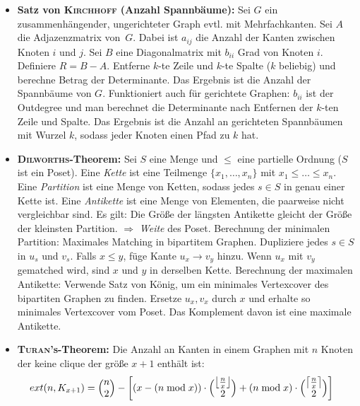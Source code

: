\begin{itemize}
	\item \textbf{Satz von \textsc{Kirchhoff} (Anzahl Spannbäume):}
	Sei $G$ ein zusammenhängender, ungerichteter Graph evtl. mit Mehrfachkanten.
	Sei $A$ die Adjazenzmatrix von~$G$.
	Dabei ist $a_{ij}$ die Anzahl der Kanten zwischen Knoten $i$ und $j$.
	Sei $B$ eine Diagonalmatrix mit $b_{ii}$ Grad von Knoten $i$.
	Definiere $R = B - A$.
	Entferne $k$-te Zeile und $k$-te Spalte ($k$ beliebig) und berechne Betrag der Determinante.
	Das Ergebnis ist die Anzahl der Spannbäume von $G$.
	\newline
	Funktioniert auch für gerichtete Graphen: $b_{ii}$ ist der Outdegree und man
	berechnet die Determinante nach Entfernen der $k$-ten Zeile und Spalte.
	Das Ergebnis ist die Anzahl an gerichteten Spannbäumen mit Wurzel $k$,
	sodass jeder Knoten einen Pfad zu $k$ hat.

	\item \textbf{\textsc{Dilworths}-Theorem:}
	Sei $S$ eine Menge und $\leq$ eine partielle Ordnung ($S$ ist ein Poset).
	Eine \emph{Kette} ist eine Teilmenge $\{x_1,\ldots,x_n\}$ mit $x_1 \leq \ldots \leq x_n$.
	Eine \emph{Partition} ist eine Menge von Ketten, sodass jedes $s \in S$ in genau einer Kette ist.
	Eine \emph{Antikette} ist eine Menge von Elementen, die paarweise nicht vergleichbar sind.
	\newline
	Es gilt: Die Größe der längsten Antikette gleicht der Größe der kleinsten Partition.
	$\Rightarrow$ \emph{Weite} des Poset.
	\newline
	Berechnung der minimalen Partition: Maximales Matching in bipartitem Graphen.
	Dupliziere jedes $s \in S$ in $u_s$ und $v_s$.
	Falls $x \leq y$, füge Kante $u_x \to v_y$ hinzu.
	Wenn $u_x$ mit $v_y$ gematched wird, sind $x$ und $y$ in derselben Kette.
	\newline
	Berechnung der maximalen Antikette: Verwende Satz von König, um ein
	minimales Vertexcover des bipartiten Graphen zu finden.
	Ersetze $u_x, v_x$ durch $x$ und erhalte so minimales Vertexcover vom Poset.
	Das Komplement davon ist eine maximale Antikette.
	
	\item \textbf{\textsc{Turan}'s-Theorem:}
	Die Anzahl an Kanten in einem Graphen mit $n$ Knoten der keine clique der größe $x+1$ enthält ist:
	\begin{align*}
	ext(n, K_{x+1}) &= \Bigl( \begin{matrix} n \\ 2 \end{matrix} \Bigr) - \left[\left(x - (n \bmod x)\right) \cdot \Bigl( \begin{matrix} \left\lfloor\frac{n}{x}\right\rfloor \\ 2 \end{matrix} \Bigr) + \left(n\bmod x\right)  \cdot \Bigl( \begin{matrix} \left\lceil\frac{n}{x}\right\rceil \\ 2 \end{matrix} \Bigr)\right]
	\end{align*}
	

\end{itemize}
